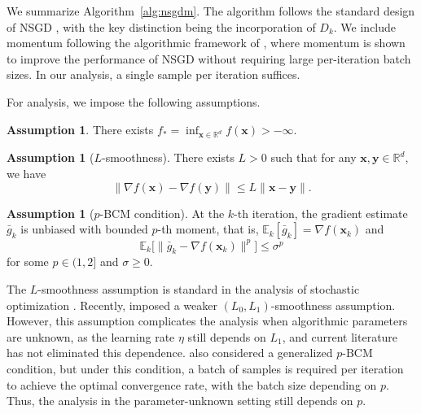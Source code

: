 \documentclass{article}
\newcommand{\bx}{\boldsymbol{x}}
\newcommand{\barg}{\bar{g}}
\theoremstyle{plain}
\theoremstyle{definition}
\newtheorem{assumption}[theorem]{Assumption}
\theoremstyle{remark}
\begin{document}
We summarize %
Algorithm~\ref{alg:nsgdm}. The algorithm follows the standard design of NSGD \citep{Liu2025Nonconvex,Sun2025Revisiting}, with the key distinction being the incorporation of $D_k$. We include momentum following the algorithmic framework of \citet{Cutkosky2020Momentum}, where momentum is shown to improve the performance of NSGD without requiring large per-iteration batch sizes. In our analysis, a single sample per iteration suffices.

For analysis, we impose the following assumptions.
\begin{assumption}\label{assumption1}
There exists
$f_{*} = \inf_{\bx \in \mathbb{R}^d} f(\bx) > -\infty$.
\end{assumption}

\begin{assumption}[$L$-smoothness]\label{assumption2}
There exists $L > 0$ such that for any $\bx, \boldsymbol{y} \in \mathbb{R}^d$, we have
\begin{equation*}
  \|\nabla f(\boldsymbol{x}) - \nabla f(\boldsymbol{y})\| \leq L \|\bx - \boldsymbol{y}\|.  
\end{equation*}
\end{assumption}

\begin{assumption}[$p$-BCM condition]\label{assumption3}
At the $k$-th iteration, the gradient estimate $\barg_k$ is unbiased with bounded $p$-th moment, that is,
$\mathbb{E}_k[\barg_k ] = \nabla f(\bx_k)$ and
\begin{equation*}
\mathbb{E}_k \big[ \|\barg_k - \nabla f(\bx_k)\|^p \big] \leq \sigma^p
\end{equation*}
for some $p \in (1,2]$ and $\sigma \geq 0$.
\end{assumption}

The $L$-smoothness assumption is standard in the analysis of stochastic optimization \citep{Zhang2020Adaptive,Sun2025Revisiting,Hubler2024Gradient}. Recently, \citet{Liu2025Nonconvex} imposed a weaker $(L_0,L_1)$-smoothness assumption. However, this assumption complicates the analysis when algorithmic parameters are unknown, as the learning rate $\eta$ still depends on $L_1$, and current literature has not eliminated this dependence. \citet{Liu2025Nonconvex} also considered a generalized $p$-BCM condition, but under this condition, a batch of samples is required per iteration to achieve the optimal convergence rate, with the batch size depending on $p$. Thus, the analysis in the parameter-unknown setting still depends on $p$.
  
\end{document}
